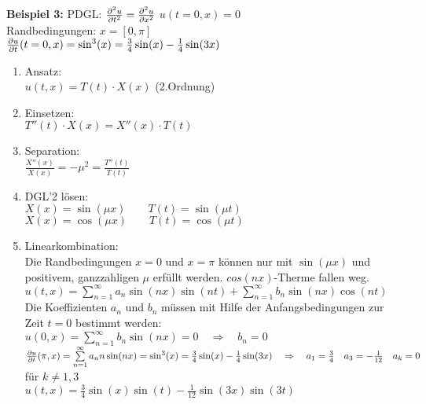 \hfill
\begin{minipage}{0.49\textwidth}
\textbf{Beispiel 3: }PDGL: $\frac{\partial ^2u}{\partial t^2}=\frac{\partial ^2u}{\partial x^2}$ \quad $u(t=0,x)=0$\\
Randbedingungen: $x=[0,\pi]$ \\
\qquad\qquad $\frac{\partial u}{\partial t}(t=0,x)=\sin^3(x)=\frac34\sin(x)-\frac14\sin(3x)$
\begin{enumerate}
	\item Ansatz:\\[0.4cm]
	$u(t,x)=T(t) \cdot X(x) $ (2.Ordnung)
	\item Einsetzen:\\[0.4cm]
	$T''(t)\cdot X(x) = X''(x)\cdot T(t)$
	\item Separation:\\[0.4cm]
	$\frac{X''(x)}{X(x)}= -\mu^2=\frac{T''(t)}{T(t)}$
	\item DGL'2 lösen:\\[0.4cm]
		$X(x)=\sin(\mu x) \qquad T(t)=\sin(\mu t)$\\
		$X(x)=\cos(\mu x) \qquad T(t)=\cos(\mu t)$
	\item Linearkombination:\\[0.4cm]
		Die Randbedingungen $x=0$ und $x=\pi$ können nur mit $\sin(\mu x) $ und  positivem, ganzzahligen $\mu$ erfüllt werden. $cos(nx)$-Therme fallen weg.\\[0.4cm]
		$u(t,x)=\sum\limits_{n=1}^{\infty}{a_n\sin(nx)\sin(nt)} + \sum\limits_{n=1}^{\infty}{b_n\sin(nx)\cos(nt)}$\\[0.4cm]
		Die Koeffizienten $a_n$ und $b_n$ müssen mit Hilfe der Anfangsbedingungen zur Zeit $t=0$ bestimmt werden:\\[0.4cm]
		$u(0,x)=\sum\limits_{n=1}^{\infty}{b_n\sin(nx)}=0 \quad\Rightarrow\quad b_n=0$\\[0.2cm]
		$\frac{\partial u}{\partial t}(\pi,x)=\sum\limits_{n=1}^{\infty}{a_nn\sin(nx)}=\sin^3(x)=\frac34\sin(x)-\frac14\sin(3x) \quad\Rightarrow\quad a_1=\frac34 \quad a_3=-\frac{1}{12}\quad a_k=0$ für $k\neq 1,3$\\[0.4cm]
		$u(t,x)=\frac34\sin(x)\sin(t)-\frac1{12}\sin(3x)\sin(3t)$
\end{enumerate}
\end{minipage}



